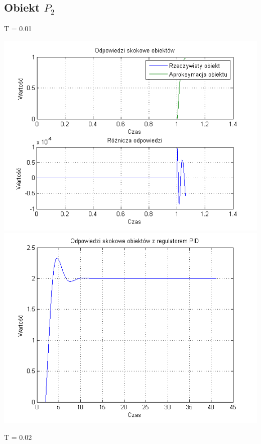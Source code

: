 \documentclass[10pt,a4paper]{article}
\begin{document}
\newpage
\subsection{Obiekt $P_2$}
T = 0.01
\begin{center}
\includegraphics[scale=1]{images/dwa/skrypt_43.png}\\
\includegraphics[scale=1]{images/dwa/skrypt_44.png}\\
\end{center}
\newpage
T = 0.02
\end{document}
